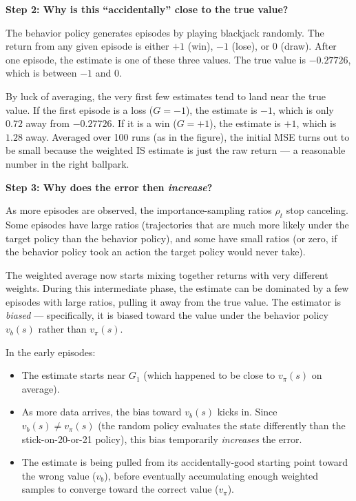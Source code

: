 \documentclass[11pt]{article}
\begin{document}
\textbf{Step 2: Why is this ``accidentally'' close to the true value?}

The behavior policy generates episodes by playing blackjack randomly. The return from any given episode is either $+1$ (win), $-1$ (lose), or $0$ (draw). After one episode, the estimate is one of these three values. The true value is $-0.27726$, which is between $-1$ and $0$.

By luck of averaging, the very first few estimates tend to land near the true value. If the first episode is a loss ($G = -1$), the estimate is $-1$, which is only $0.72$ away from $-0.27726$. If it is a win ($G = +1$), the estimate is $+1$, which is $1.28$ away. Averaged over 100 runs (as in the figure), the initial MSE turns out to be small because the weighted IS estimate is just the raw return --- a reasonable number in the right ballpark.

\textbf{Step 3: Why does the error then \textit{increase}?}

As more episodes are observed, the importance-sampling ratios $\rho_t$ stop canceling. Some episodes have large ratios (trajectories that are much more likely under the target policy than the behavior policy), and some have small ratios (or zero, if the behavior policy took an action the target policy would never take).

The weighted average now starts mixing together returns with very different weights. During this intermediate phase, the estimate can be dominated by a few episodes with large ratios, pulling it away from the true value. The estimator is \textit{biased} --- specifically, it is biased toward the value under the behavior policy $v_b(s)$ rather than $v_\pi(s)$.

In the early episodes:
\begin{itemize}[nosep]
    \item The estimate starts near $G_1$ (which happened to be close to $v_\pi(s)$ on average).
    \item As more data arrives, the bias toward $v_b(s)$ kicks in. Since $v_b(s) \neq v_\pi(s)$ (the random policy evaluates the state differently than the stick-on-20-or-21 policy), this bias temporarily \textit{increases} the error.
    \item The estimate is being pulled from its accidentally-good starting point toward the wrong value ($v_b$), before eventually accumulating enough weighted samples to converge toward the correct value ($v_\pi$).
\end{itemize}
\end{document}
